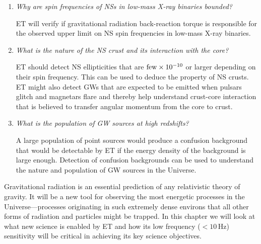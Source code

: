 \begin{enumerate}
\item {\em Why are spin frequencies of NSs in low-mass X-ray binaries bounded?}

ET will verify if gravitational radiation back-reaction torque is responsible 
for the observed upper limit on NS spin frequencies in low-mass X-ray binaries.

\item {\em What is the nature of the NS crust and its interaction 
with the core?}

ET should detect NS ellipticities that are $\rm few \times 10^{-10}$
or larger depending on their spin frequency. This can be used to deduce the
property of NS crusts. ET might also detect GWs 
that are expected to be emitted when pulsars glitch and magnetars flare and thereby
help understand crust-core interaction that is believed to transfer angular 
momentum from the core to crust.

\item {\em What is the population of GW sources at high redshifts?}

A large population of point sources would produce a confusion background that would
be detectable by ET if the energy density of the background is large enough.
Detection of confusion backgrounds can be used to understand the nature and
population of GW sources in the Universe.
\end{enumerate}
%
Gravitational radiation is an essential prediction of any relativistic
theory of gravity. It will be a new tool for observing the most 
energetic processes in the Universe---processes originating
in such extremely dense environs that all other forms of radiation
and particles might be trapped. In this chapter we will look at
what new science is enabled by ET and how its low frequency 
($<10$\,Hz) sensitivity will be critical in achieving its key science objectives. 


